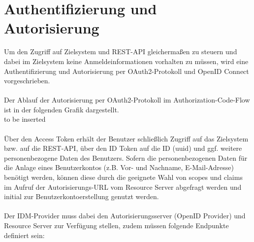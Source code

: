 \chapter{Authentifizierung und Autorisierung}
Um den Zugriff auf Zielsystem und REST-API gleichermaßen zu steuern und dabei im Zielsystem keine Anmeldeinformationen vorhalten zu müssen, wird eine Authentifizierung und Autorisierung per OAuth2-Protokoll und OpenID Connect vorgeschrieben.\\
\\
Der Ablauf der Autorisierung per OAuth2-Protokoll im Authorization-Code-Flow ist in der folgenden Grafik dargestellt. 
\\
to be inserted\\
\\
Über den Access Token erhält der Benutzer schließlich Zugriff auf das Zielsystem bzw. auf die REST-API, über den ID Token auf die ID (uuid) und ggf. weitere personenbezogene Daten des Benutzers. 
Sofern die personenbezogenen Daten für die Anlage eines Benutzerkontos (z.B. Vor- und Nachname, E-Mail-Adresse) benötigt werden, können diese durch die geeignete Wahl von scopes und claims im Aufruf der Autorisierungs-URL vom Resource Server abgefragt werden und initial zur Benutzerkontoerstellung genutzt werden.\\
\\
Der IDM-Provider muss dabei den Autorisierungsserver (OpenID Provider) und Resource Server zur Verfügung stellen, zudem müssen folgende Endpunkte definiert sein:\\

